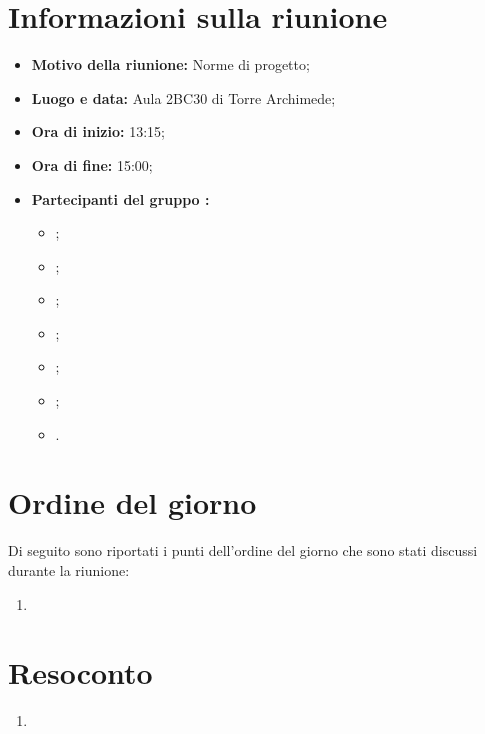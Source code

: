 \documentclass[VER-2017-11-23.tex]{subfiles}
\begin{document}
\chapter{Informazioni sulla riunione}
\begin{itemize}
	\item \textbf{Motivo della riunione:} Norme di progetto;
	\item \textbf{Luogo e data:} Aula 2BC30 di Torre Archimede;
	\item \textbf{Ora di inizio:} 13:15;
	\item \textbf{Ora di fine:} 15:00;
	\item \textbf{Partecipanti del gruppo \gruppo:}
	\begin{itemize}
		\item \Davide;
		\item \Elena;
		\item \Gianluca;
		\item \Mirco;
		\item \Parwinder;
		\item \Riccardo;
		\item \Valentina.
	\end{itemize}
\end{itemize}
\chapter{Ordine del giorno}	
Di seguito sono riportati i punti dell'ordine del giorno che sono stati discussi durante la riunione:
\begin{enumerate}
	\item 
\end{enumerate}
\chapter{Resoconto}
\begin{enumerate}
	\item \textbf{}
\end{enumerate} 
\end{document}
